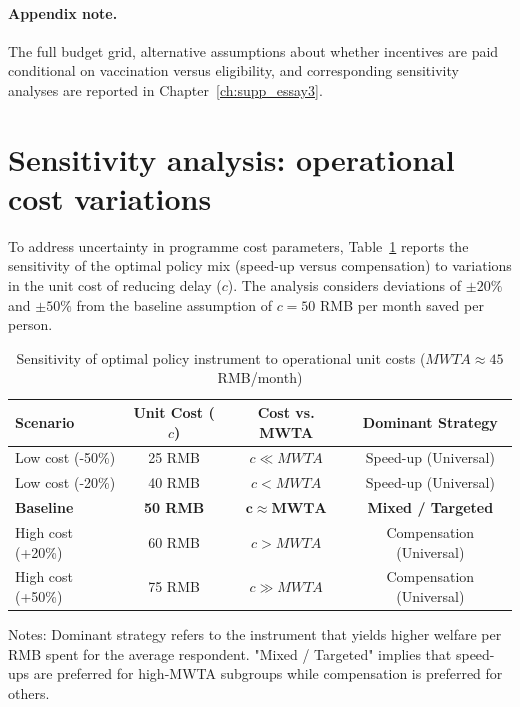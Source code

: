 \documentclass[doublespacing]{utdthesis}
\begin{document}
\paragraph{Appendix note.}
The full budget grid, alternative assumptions about whether incentives are paid conditional on vaccination versus eligibility, and corresponding sensitivity analyses are reported in Chapter~\ref{ch:supp_essay3}.


\section{Sensitivity analysis: operational cost variations}
\label{sec:supp_essay3_sensitivity}

To address uncertainty in programme cost parameters, Table~\ref{tab:supp_sensitivity} reports the sensitivity of the optimal policy mix (speed-up versus compensation) to variations in the unit cost of reducing delay ($c$). The analysis considers deviations of $\pm 20\%$ and $\pm 50\%$ from the baseline assumption of $c=50$ RMB per month saved per person.

\begin{table}[htbp]
\centering
\caption{Sensitivity of optimal policy instrument to operational unit costs ($MWTA \approx 45$ RMB/month)}
\label{tab:supp_sensitivity}
\begin{threeparttable}
\begin{tabular}{lccc}
\toprule
Scenario & Unit Cost ($c$) & Cost vs. MWTA & Dominant Strategy \\
\midrule
Low cost (-50\%) & 25 RMB & $c \ll MWTA$ & Speed-up (Universal) \\
Low cost (-20\%) & 40 RMB & $c < MWTA$ & Speed-up (Universal) \\
\textbf{Baseline} & \textbf{50 RMB} & $\mathbf{c \approx MWTA}$ & \textbf{Mixed / Targeted} \\
High cost (+20\%) & 60 RMB & $c > MWTA$ & Compensation (Universal) \\
High cost (+50\%) & 75 RMB & $c \gg MWTA$ & Compensation (Universal) \\
\bottomrule
\end{tabular}
\begin{tablenotes}
\footnotesize
\item Notes: Dominant strategy refers to the instrument that yields higher welfare per RMB spent for the average respondent. "Mixed / Targeted" implies that speed-ups are preferred for high-MWTA subgroups while compensation is preferred for others.
\end{tablenotes}
\end{threeparttable}
\end{table}
\end{document}
